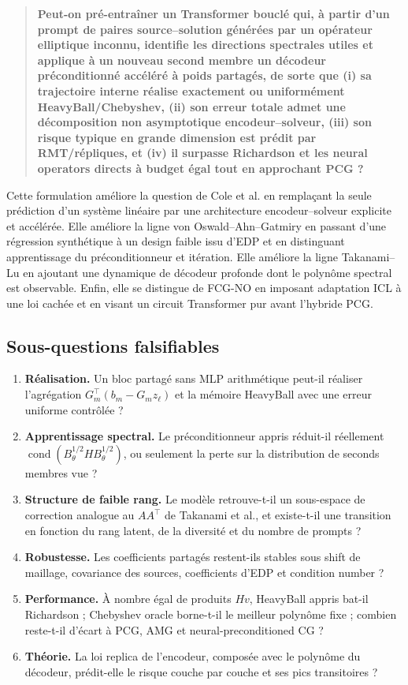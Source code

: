 \documentclass[11pt,a4paper]{article}
\newcommand{\cond}{\operatorname{cond}}
\begin{document}
\begin{quote}
\textbf{Peut-on pré-entraîner un Transformer bouclé qui, à partir d'un prompt
de paires source--solution générées par un opérateur elliptique inconnu,
identifie les directions spectrales utiles et applique à un nouveau second
membre un décodeur préconditionné accéléré à poids partagés, de sorte que (i)
sa trajectoire interne réalise exactement ou uniformément HeavyBall/Chebyshev,
(ii) son erreur totale admet une décomposition non asymptotique
encodeur--solveur, (iii) son risque typique en grande dimension est prédit par
RMT/répliques, et (iv) il surpasse Richardson et les neural operators directs à
budget égal tout en approchant PCG ?}
\end{quote}

Cette formulation améliore la question de Cole et al. en remplaçant la seule
prédiction d'un système linéaire par une architecture encodeur--solveur
explicite et accélérée. Elle améliore la ligne von Oswald--Ahn--Gatmiry en
passant d'une régression synthétique à un design faible issu d'EDP et en
distinguant apprentissage du préconditionneur et itération. Elle améliore la
ligne Takanami--Lu en ajoutant une dynamique de décodeur profonde dont le
polynôme spectral est observable. Enfin, elle se distingue de FCG-NO en
imposant adaptation ICL à une loi cachée et en visant un circuit Transformer
pur avant l'hybride PCG.

\subsection{Sous-questions falsifiables}

\begin{enumerate}[leftmargin=*]
  \item \textbf{Réalisation.} Un bloc partagé sans MLP arithmétique peut-il
  réaliser l'agrégation $G_m^\top(b_m-G_mz_\ell)$ et la mémoire HeavyBall avec
  une erreur uniforme contrôlée ?
  \item \textbf{Apprentissage spectral.} Le préconditionneur appris réduit-il
  réellement $\cond(B_\theta^{1/2}H B_\theta^{1/2})$, ou seulement la perte sur
  la distribution de seconds membres vue ?
  \item \textbf{Structure de faible rang.} Le modèle retrouve-t-il un sous-espace
  de correction analogue au $AA^\top$ de Takanami et al., et existe-t-il une
  transition en fonction du rang latent, de la diversité et du nombre de
  prompts ?
  \item \textbf{Robustesse.} Les coefficients partagés restent-ils stables sous
  shift de maillage, covariance des sources, coefficients d'EDP et condition
  number ?
  \item \textbf{Performance.} À nombre égal de produits $Hv$, HeavyBall appris
  bat-il Richardson ; Chebyshev oracle borne-t-il le meilleur polynôme fixe ;
  combien reste-t-il d'écart à PCG, AMG et neural-preconditioned CG ?
  \item \textbf{Théorie.} La loi replica de l'encodeur, composée avec le
  polynôme du décodeur, prédit-elle le risque couche par couche et ses pics
  transitoires ?
\end{enumerate}
\end{document}
